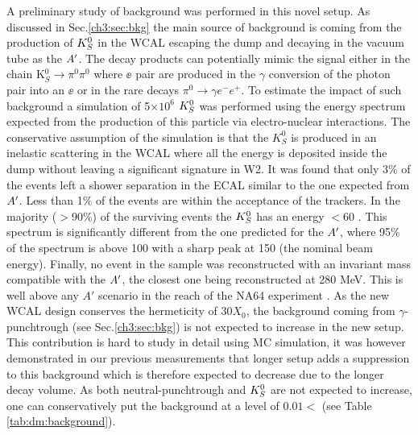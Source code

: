 A preliminary study of background was performed in this novel setup. As discussed in Sec.\ref{ch3:sec:bkg} the main source of background is coming from the production of $K^0_S$ in the WCAL escaping the dump and decaying in the vacuum tube as the $A'$. The decay products can potentially mimic the signal either in the chain K$^0_S \rightarrow \pi^0 \pi^0$ where $\ee$ pair are produced in the $\gamma$ conversion of the photon pair into an $\ee$ or in the rare decays $\pi^0 \rightarrow \gamma e^- e^+$. To estimate the impact of such background a simulation of 5$\times 10^6$ $K^0_S$ was performed using the energy spectrum expected from the production of this particle via electro-nuclear interactions.
The conservative assumption of the simulation is that the $K^0_S$ is produced in an inelastic scattering in the WCAL where all the energy is deposited inside the dump without leaving a significant signature in W2. It was found that only 3\% of the events left a shower separation in the ECAL similar to the one expected from $A'$. Less than 1\% of the events are within the acceptance of the trackers. In the majority ($>$90\%) of the surviving events the $K^0_S$ has an energy $<$60 \gev. This spectrum is significantly different from the one predicted for the $A'$, where 95\% of the spectrum is above 100 \gev with a sharp peak at 150 \gev (the nominal beam energy). Finally, no event in the sample was reconstructed with an invariant mass compatible with the $A'$, the closest one being reconstructed at 280 MeV. This is well above any $A'$ scenario in the reach of the NA64 experiment \cite{Banerjee:2019hmi}. As the new WCAL design conserves the hermeticity of 30$X_0$, the background coming from $\gamma$-punchtrough (see Sec.\ref{ch3:sec:bkg}) is not expected to increase in the new setup. This contribution is hard to study in detail using MC simulation, it was however demonstrated in our previous measurements \cite{Banerjee:2019hmi} that longer setup adds a suppression to this background which is therefore expected to decrease due to the longer decay volume. As both neutral-punchtrough and $K^0_S$ are not expected to increase, one can conservatively put the background at a level of $0.01<$ (see Table \ref{tab:dm:background}).

